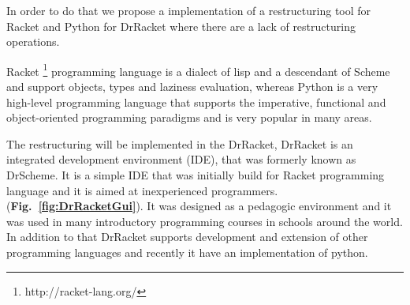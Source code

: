 In order to do that we propose a implementation of a restructuring tool for Racket and Python for DrRacket where there are a lack of restructuring operations.


Racket \footnote{http://racket-lang.org/} programming language is a dialect of lisp and a descendant of Scheme and support objects, types and laziness evaluation,
whereas Python is a very high-level programming language that supports the imperative, functional and object-oriented programming paradigms and is very popular in many areas.


The restructuring will be implemented in the DrRacket, DrRacket is an integrated development environment (IDE), that was formerly known as DrScheme. It is a simple IDE that was initially build for Racket programming language and it is aimed at inexperienced programmers. ({\bf Fig.~\ref{fig:DrRacketGui}}).
It was designed as a pedagogic environment \cite{drscheme_pegadogy} and it was used in many introductory programming courses in schools around the world. In addition to that DrRacket supports development and extension of other programming languages \cite{tobin2011languages} and recently it have an implementation of python. \cite{ramos2014implementation}





